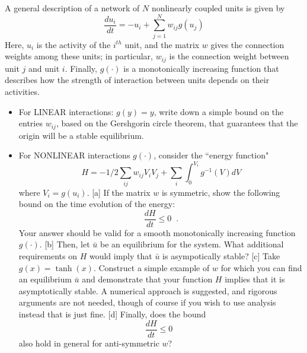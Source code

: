 \documentclass[12pt]{report}
\newcommand{\bei}{\begin{itemize}}
\newcommand{\eei}{\end{itemize}}
\newcommand{\beq}{\begin{equation}}
\newcommand{\eeq}{\end{equation}}
\begin{document}

\begin{problem}
    A general description of a network of $N$ nonlinearly coupled units is given by
    \beq
    \frac {d u_i}{dt} = -u_i + \sum_{j=1}^N w_{ij} g(u_j)
    \eeq
    Here, $u_i$ is the activity of the $i^{th}$ unit, and the matrix $w$ gives the connection weights among these units; in particular, $w_{ij}$ is the connection weight between unit $j$ and unit $i$.  Finally, $g(\cdot)$ is a monotonically increasing function that describes how the strength of interaction between units depends on their activities.

    \bei
    \item For LINEAR interactions:  $g(y) = y$, write down a simple bound on the entries $w_{ij}$, based on the Gershgorin circle theorem, that guarantees that the origin will be a stable equilibrium.


    \item  For NONLINEAR interactions $g(\cdot)$, consider the ``energy function" \beq H=-1/2 \sum_{ij} w_{ij} V_i V_j + \sum_i \int_0^{V_i} g^{-1}(V) dV \eeq
    where $V_i=g(u_i)$.  [a] If the matrix $w$ is symmetric, show the following bound on the time evolution of the energy:  $$\frac{dH}{dt} \le 0 \; \;.$$  Your answer should be valid for a smooth monotonically increasing function $g(\cdot)$.  [b] Then, let $\bar u$ be an equilibrium for the system.  What additional requirements on $H$ would imply that $\bar u$ is asympotically stable?  [c]  Take $g(x) = \tanh(x)$. Construct a simple example of $w$ for which you can find an equilibrium $\bar u$ and demonstrate that your function $H$ implies that it is asymptotically stable.  A numerical approach is suggested, and rigorous arguments are not needed, though of course if you wish to use analysis instead that is just fine.  [d] Finally, does the bound  $$\frac{dH}{dt} \le 0 \; \;$$ also hold in general for anti-symmetric $w$? 
    \eei
\end{problem}
\end{document}
